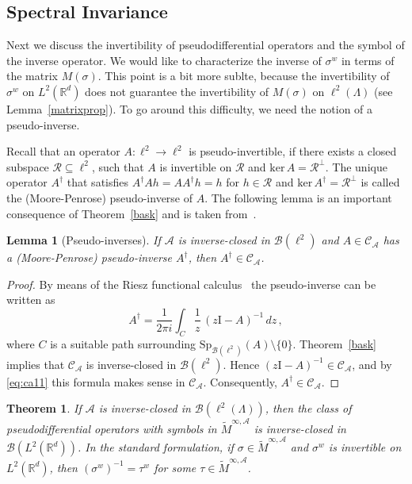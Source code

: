 \documentclass[12pt]{amsart}
\newtheorem{theorem}{Theorem}[section]
\newtheorem{lemma}{Lemma}[section]
\theoremstyle{definition}
\theoremstyle{remark}
\numberwithin{equation}{section}
\newcommand{\psdo}{pseudodifferential operator}
\newcommand{\symbo}{\widetilde M^{\infty, \cA}}
\def\cB{\mathcal{B}}
\def\cA{\mathcal{A}}
\def\cC{\mathcal{C}}
\def\cR{\mathcal{R}}
\def\bR{{\mathbb{R}}}
\def\cca{\Cal C_\ac}
\def\rd{\bR^d}
\def\lrd{L^2(\rd)}
\def\inv{^{-1}}
\def\cB{\mathcal{B}}
\def\cA{\mathcal{A}}
\def\cC{\mathcal{C}}
\def\cR{\mathcal{R}}
\newcommand{\Cal}{\mathcal}
\newcommand{\La}{\Lambda}
\newcommand{\ac}{\Cal A}
\newcommand{\moda}{\widetilde M^{\infty,\ac}}
\begin{document}
\subsection{Spectral Invariance}


Next we discuss the invertibility of \psdo s and the symbol of the
inverse operator. We would like to characterize the inverse of
$\sigma
^w$ in terms of the  matrix $M(\sigma )$. This point is a bit more
sublte, because the invertibility of $\sigma^w$ on $\lrd$ does not
guarantee the invertibility of $M(\sigma)$ on $\ell^2(\La)$ (see
Lemma~\ref{matrixprop}). To go around this difficulty, we need the
notion of a  pseudo-inverse.


Recall that an operator $A: \ell ^2 \to \ell ^2$ is
pseudo-invertible, if there exists a closed subspace $\cR
\subseteq \ell ^2$, such that $A$ is invertible on $\cR$ and
$\mathrm{ker}\, A = \cR ^\perp $. The unique operator $A^\dagger $
that satisfies $A^\dagger A h = A A^\dagger h = h $ for $h\in \cR$
and $\mathrm{ker}\, A^\dagger = \cR^\perp $ is called the
(Moore-Penrose) pseudo-inverse of $A$. The following lemma is an
important consequence of Theorem~\ref{bask} and is  taken
from~\cite{gro06}.


\begin{lemma}[Pseudo-inverses]   \label{pseudo}
If $\ac $ is inverse-closed in $\cB (\ell ^2)$   and $A\in \cca$
has a (Moore-Penrose)
pseudo-inverse $A^\dagger$, then $A^\dagger \in \cca $.
\end{lemma}

\begin{proof}
By means of the Riesz functional calculus~\cite{rudin73}  the
pseudo-inverse can be written as
$$
A^{\dagger }  = \frac{1}{2\pi
i} \int _{ C } \frac{1}{z}\, (z\mathrm{I}-A)\inv \, dz \, ,
$$
where $C$ is a suitable path surrounding $\mathrm{Sp}_{\cB (\ell
^2)} (A) \setminus \{ 0\}$.  Theorem~\ref{bask}   implies that
$\cC _{\cA }$ is inverse-closed in $\cB (\ell ^2)$. Hence 
$(z\mathrm{I}-A)\inv\in\cca$, and  by \eqref{eq:ca11} this formula
makes
sense in  $\cca$.  Consequently,  $A^\dagger \in \cca $.
\end{proof}


\begin{theorem}\label{wiener} If $\ac$ is inverse-closed in $\cB (\ell ^2(\Lambda
))$, then the class of pseudodifferential operators with symbols in  $\moda$ is
inverse-closed in $\cB (\lrd )$. In the standard formulation, if
$\sigma \in \symbo $ and $\sigma ^w $ is invertible on $\lrd $, then
$(\sigma ^w)\inv = \tau ^w$ for some $\tau \in \symbo $. 
\end{theorem}
\end{document}
